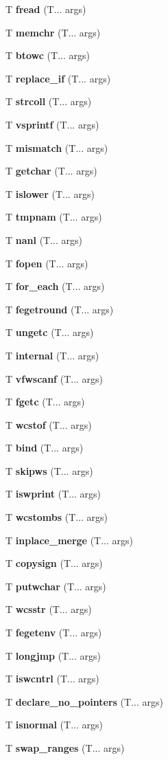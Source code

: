 \begin{DoxyCompactItemize}
T \textbf{ fread} (T... args)
\item 
T \textbf{ memchr} (T... args)
\item 
T \textbf{ btowc} (T... args)
\item 
T \textbf{ replace\+\_\+if} (T... args)
\item 
T \textbf{ strcoll} (T... args)
\item 
T \textbf{ vsprintf} (T... args)
\item 
T \textbf{ mismatch} (T... args)
\item 
T \textbf{ getchar} (T... args)
\item 
T \textbf{ islower} (T... args)
\item 
T \textbf{ tmpnam} (T... args)
\item 
T \textbf{ nanl} (T... args)
\item 
T \textbf{ fopen} (T... args)
\item 
T \textbf{ for\+\_\+each} (T... args)
\item 
T \textbf{ fegetround} (T... args)
\item 
T \textbf{ ungetc} (T... args)
\item 
T \textbf{ internal} (T... args)
\item 
T \textbf{ vfwscanf} (T... args)
\item 
T \textbf{ fgetc} (T... args)
\item 
T \textbf{ wcstof} (T... args)
\item 
T \textbf{ bind} (T... args)
\item 
T \textbf{ skipws} (T... args)
\item 
T \textbf{ iswprint} (T... args)
\item 
T \textbf{ wcstombs} (T... args)
\item 
T \textbf{ inplace\+\_\+merge} (T... args)
\item 
T \textbf{ copysign} (T... args)
\item 
T \textbf{ putwchar} (T... args)
\item 
T \textbf{ wcsstr} (T... args)
\item 
T \textbf{ fegetenv} (T... args)
\item 
T \textbf{ longjmp} (T... args)
\item 
T \textbf{ iswcntrl} (T... args)
\item 
T \textbf{ declare\+\_\+no\+\_\+pointers} (T... args)
\item 
T \textbf{ isnormal} (T... args)
\item 
T \textbf{ swap\+\_\+ranges} (T... args)

\end{DoxyCompactItemize}
